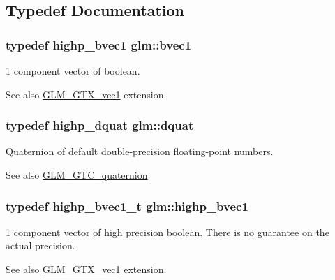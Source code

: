 \subsection{Typedef Documentation}
\subsubsection[{\texorpdfstring{bvec1}{bvec1}}]{\setlength{\rightskip}{0pt plus 5cm}typedef {\bf highp\+\_\+bvec1} {\bf glm\+::bvec1}}\hypertarget{namespaceglm_a30260c045e085bb8d19eddca772cac61}{}\label{namespaceglm_a30260c045e085bb8d19eddca772cac61}
1 component vector of boolean. \begin{DoxySeeAlso}{See also}
\hyperlink{group__gtx__vec1}{G\+L\+M\+\_\+\+G\+T\+X\+\_\+vec1} extension. 
\end{DoxySeeAlso}
\subsubsection[{\texorpdfstring{dquat}{dquat}}]{\setlength{\rightskip}{0pt plus 5cm}typedef {\bf highp\+\_\+dquat} {\bf glm\+::dquat}}\hypertarget{namespaceglm_a49693161673a003b4a8fd4d8b15b0b7b}{}\label{namespaceglm_a49693161673a003b4a8fd4d8b15b0b7b}
Quaternion of default double-\/precision floating-\/point numbers.

\begin{DoxySeeAlso}{See also}
\hyperlink{group__gtc__quaternion}{G\+L\+M\+\_\+\+G\+T\+C\+\_\+quaternion} 
\end{DoxySeeAlso}
\subsubsection[{\texorpdfstring{highp\+\_\+bvec1}{highp_bvec1}}]{\setlength{\rightskip}{0pt plus 5cm}typedef {\bf highp\+\_\+bvec1\+\_\+t} {\bf glm\+::highp\+\_\+bvec1}}\hypertarget{namespaceglm_ad24a2ac97dbfbece48f504224bb20b59}{}\label{namespaceglm_ad24a2ac97dbfbece48f504224bb20b59}
1 component vector of high precision boolean. There is no guarantee on the actual precision. \begin{DoxySeeAlso}{See also}
\hyperlink{group__gtx__vec1}{G\+L\+M\+\_\+\+G\+T\+X\+\_\+vec1} extension. 
\end{DoxySeeAlso}
